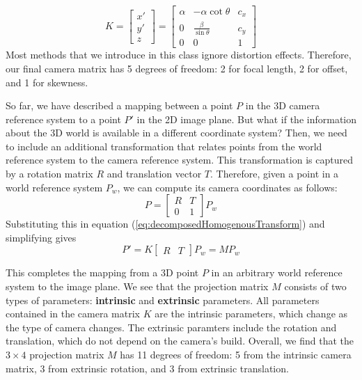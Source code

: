 \documentclass[a4paper, 12pt]{article}
\renewcommand\emph{\textbf}
\begin{document}
\begin{equation}
K = \begin{bmatrix}x'\\y'\\ z\end{bmatrix}=\begin{bmatrix}
    \alpha & -\alpha\cot\theta & c_x \\
    0 & \frac{\beta}{\sin\theta} & c_y  \\ 
    0 & 0 & 1 
    \end{bmatrix}
\end{equation}
Most methods that we introduce in this class ignore distortion effects. Therefore, our final camera matrix has 5 degrees of freedom: 2 for focal length, 2 for offset, and 1 for skewness. 

So far, we have described a mapping between a point $P$ in the 3D camera reference system to a point $P'$ in the 2D image plane. But what if the information about the 3D world is available in a different coordinate system? Then, we need to include an additional transformation that relates points from the world reference system to the camera reference system. This transformation is captured by a rotation matrix $R$ and translation vector $T$. Therefore, given a point in a world reference system $P_w$, we can compute its camera coordinates as follows:
\begin{equation}
P = \begin{bmatrix}R&T\\0&1\end{bmatrix} P_w
\end{equation}
Substituting this in equation (\ref{eq:decomposedHomogenousTransform}) and simplifying gives
\begin{equation}
P' = K\begin{bmatrix}R&T\end{bmatrix}P_w = MP_w
\label{eq:cameramatrix}
\end{equation}

This completes the mapping from a 3D point $P$ in an arbitrary world reference system to the image plane. We see that the projection matrix $M$ consists of two types of parameters: \emph{intrinsic} and \emph{extrinsic} parameters. All parameters contained in the camera matrix $K$ are the intrinsic parameters, which change as the type of camera changes. The extrinsic paramters include the rotation and translation, which do not depend on the camera's build. Overall, we find that the $3\times4$ projection matrix $M$ has 11 degrees of freedom: 5 from the intrinsic camera matrix, 3 from extrinsic rotation, and 3 from extrinsic translation.
\end{document}
